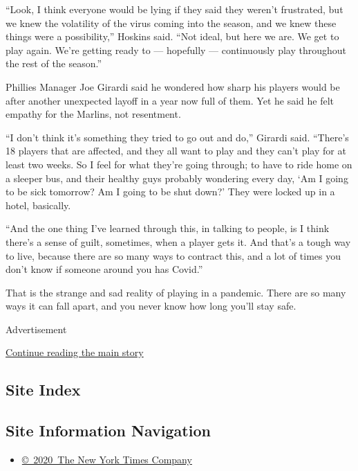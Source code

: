 ``Look, I think everyone would be lying if they said they weren't
frustrated, but we knew the volatility of the virus coming into the
season, and we knew these things were a possibility,'' Hoskins said.
``Not ideal, but here we are. We get to play again. We're getting ready
to --- hopefully --- continuously play throughout the rest of the
season.''

Phillies Manager Joe Girardi said he wondered how sharp his players
would be after another unexpected layoff in a year now full of them. Yet
he said he felt empathy for the Marlins, not resentment.

``I don't think it's something they tried to go out and do,'' Girardi
said. ``There's 18 players that are affected, and they all want to play
and they can't play for at least two weeks. So I feel for what they're
going through; to have to ride home on a sleeper bus, and their healthy
guys probably wondering every day, `Am I going to be sick tomorrow? Am I
going to be shut down?' They were locked up in a hotel, basically.

``And the one thing I've learned through this, in talking to people, is
I think there's a sense of guilt, sometimes, when a player gets it. And
that's a tough way to live, because there are so many ways to contract
this, and a lot of times you don't know if someone around you has
Covid.''

That is the strange and sad reality of playing in a pandemic. There are
so many ways it can fall apart, and you never know how long you'll stay
safe.

Advertisement

\protect\hyperlink{after-bottom}{Continue reading the main story}

\hypertarget{site-index}{%
\subsection{Site Index}\label{site-index}}

\hypertarget{site-information-navigation}{%
\subsection{Site Information
Navigation}\label{site-information-navigation}}

\begin{itemize}
\tightlist
\item
  \href{https://help.nytimes3xbfgragh.onion/hc/en-us/articles/115014792127-Copyright-notice}{©~2020~The
  New York Times Company}
\end{itemize}

